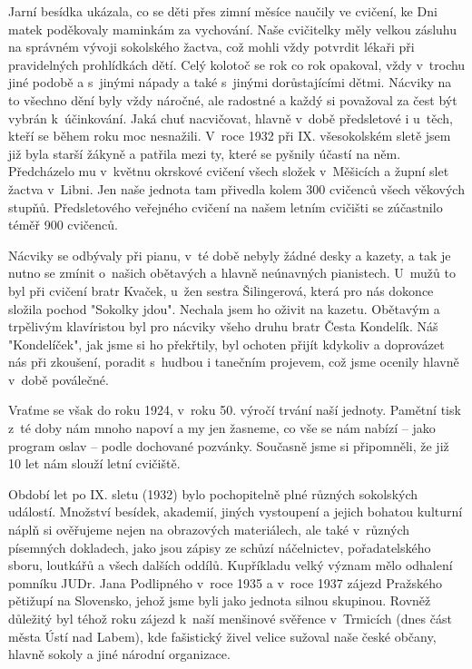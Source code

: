 \documentclass[a5paper, 11pt, twoside]{article}
\begin{document}
Jarní besídka ukázala, co se děti přes zimní měsíce naučily ve cvičení,
ke Dni matek poděkovaly maminkám za vychování. Naše cvičitelky měly
velkou zásluhu na správném vývoji sokolského žactva, což mohli vždy
potvrdit lékaři při pravidelných prohlídkách dětí. Celý kolotoč se rok
co rok opakoval, vždy v~trochu jiné podobě a s~jinými nápady a také
s~jinými dorůstajícími dětmi. Nácviky na to všechno dění byly vždy
náročné, ale radostné a každý si považoval za čest být vybrán
k~účinkování. Jaká chuť nacvičovat, hlavně v~době předsletové i u~těch,
kteří se během roku moc nesnažili. V~roce 1932 při IX. všesokolském
sletě jsem již byla starší žákyně a patřila mezi ty, které se pyšnily
účastí na něm. Předcházelo mu v~květnu okrskové cvičení všech složek
v~Měšicích a župní slet žactva v~Libni. Jen naše jednota tam přivedla
kolem 300 cvičenců všech věkových stupňů. Předsletového veřejného
cvičení na našem letním cvičišti se zúčastnilo téměř 900 cvičenců.

Nácviky se odbývaly při pianu, v~té době nebyly žádné desky a kazety, a
tak je nutno se zmínit o~našich obětavých a hlavně neúnavných
pianistech. U~mužů to byl při cvičení bratr Kvaček, u~žen sestra
Šilingerová, která pro nás dokonce složila pochod "Sokolky jdou".
Nechala jsem ho oživit na kazetu. Obětavým a trpělivým klavíristou byl
pro nácviky všeho druhu bratr Česta Kondelík. Náš "Kondelíček", jak
jsme si ho překřtily, byl ochoten přijít kdykoliv a doprovázet nás při
zkoušení, poradit s~hudbou i tanečním projevem, což jsme ocenily hlavně
v~době poválečné.

Vraťme se však do roku 1924, v~roku 50. výročí trvání naší jednoty.
Pamětní tisk z~té doby nám mnoho napoví a my jen žasneme, co vše se nám
nabízí -- jako program oslav -- podle dochované pozvánky. Současně jsme
si připomněli, že již 10 let nám slouží letní cvičiště.

Období let po IX. sletu (1932) bylo pochopitelně plné různých sokolských
událostí. Množství besídek, akademií, jiných vystoupení a jejich bohatou
kulturní náplň si ověřujeme nejen na obrazových materiálech, ale také
v~různých písemných dokladech, jako jsou zápisy ze schůzí náčelnictev,
pořadatelského sboru, loutkářů a všech dalších oddílů. Kupříkladu velký
význam mělo odhalení pomníku JUDr. Jana Podlipného v~roce 1935 a v~roce
1937 zájezd Pražského pětižupí na Slovensko, jehož jsme byli jako
jednota silnou skupinou. Rovněž důležitý byl téhož roku zájezd k~naší
menšinové svěřence v~Trmicích (dnes část města Ústí nad Labem), kde
fašistický živel velice sužoval naše české občany, hlavně sokoly a jiné
národní organizace.
\end{document}
